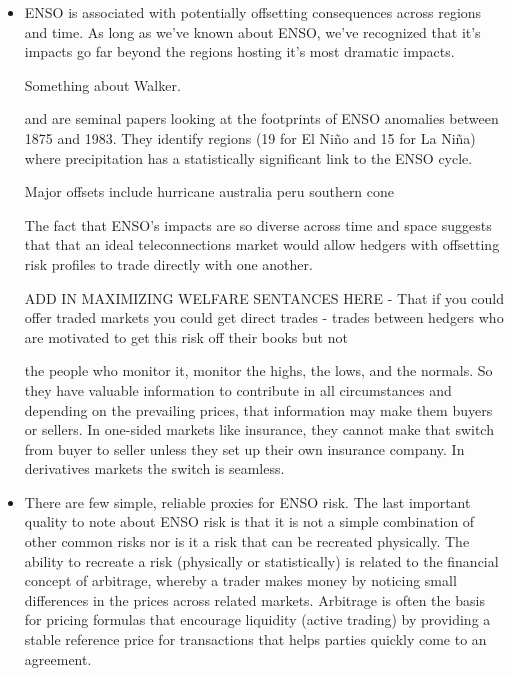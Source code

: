 \documentclass[authoryear]{article}
\begin{document}
\begin{itemize}
\item ENSO is associated with potentially offsetting consequences across regions and time. 
As long as we've known about ENSO, we've recognized that it's impacts go far beyond the regions hosting it's most dramatic impacts.

Something about Walker.

\citet{ropelewski1987global} and \citet{ropelewski1989precipitation} are seminal papers looking at the footprints of ENSO anomalies between 1875 and 1983.  They identify regions (19 for El Ni\~no and 15 for La Ni\~na) where precipitation has a statistically significant link to the ENSO cycle.

Major offsets include hurricane australia peru southern cone

The fact that ENSO's impacts are so diverse across time and space suggests that that an ideal teleconnections market would allow hedgers with offsetting risk profiles to trade directly with one another.

ADD IN MAXIMIZING WELFARE SENTANCES HERE - 
That if you could offer traded markets you could get direct trades - trades between hedgers who are motivated to get this risk off their books but not

the people who monitor it, monitor the highs, the lows, and the normals. So they have valuable information to contribute in all circumstances and depending on the prevailing prices, that information may make them buyers or sellers. In one-sided markets like insurance, they cannot make that switch from buyer to seller unless they set up their own insurance company. In derivatives markets the switch is seamless.

\item There are few simple, reliable proxies for ENSO risk.
The last important quality to note about ENSO risk is that it is not a simple combination of other common risks nor is it a risk that can be recreated physically. The ability to recreate a risk (physically or statistically) is related to the financial concept of arbitrage, whereby a trader makes money by noticing small differences in the prices across related markets. Arbitrage is often the basis for pricing formulas that encourage liquidity (active trading) by providing a stable reference price for transactions that helps parties quickly come to an agreement. 


\end{itemize}
\end{document}
